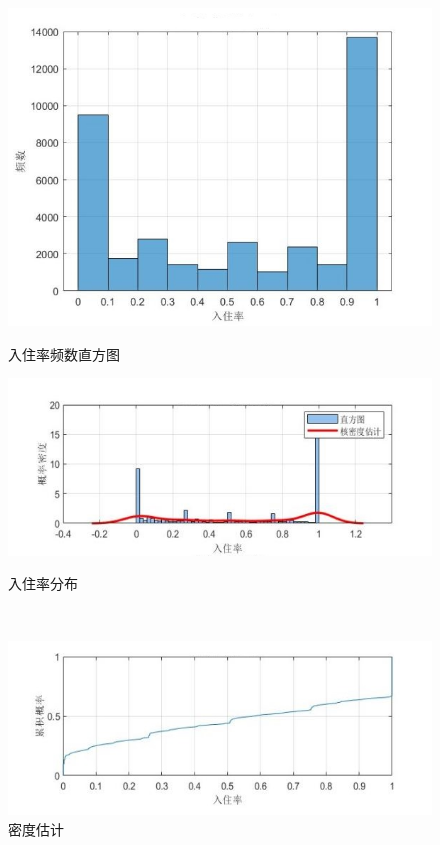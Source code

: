 \documentclass[12pt]{article}
\begin{document}
\begin{CJK}{UTF8}{gbsn}
	
	\begin{figure}[htp]
		\centering
		\begin{minipage}[b]{0.5\textwidth}
			\centering
			\includegraphics[width=1\linewidth]{pic/5.jpg}
			\caption{入住率频数直方图}
		\end{minipage}%
		\hfill
		\begin{minipage}[b]{0.5\textwidth}
			\centering
			\begin{minipage}[b]{\textwidth}
				\centering
				\includegraphics[width=0.8\linewidth]{pic/61.jpg}
				\caption{入住率分布}
			\end{minipage}\\[10pt]
			\begin{minipage}[b]{\textwidth}
				\centering
				\includegraphics[width=0.8\linewidth]{pic/62.jpg}
				\caption{密度估计}
			\end{minipage}
		\end{minipage}
	\end{figure}
	

\end{CJK}
\end{document}
